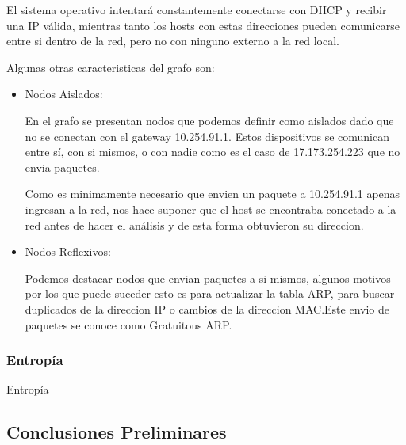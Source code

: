 	\par El sistema operativo intentará constantemente conectarse con DHCP y recibir una IP válida, mientras tanto los hosts con estas direcciones pueden comunicarse entre si dentro de la red, pero no con ninguno externo a la red local.

	\par Algunas otras caracteristicas del grafo son:

\begin{itemize}

\item Nodos Aislados:

	\par En el grafo se presentan nodos que podemos definir como aislados dado que no se conectan con el gateway 10.254.91.1.
Estos dispositivos se comunican entre sí, con si mismos, o con nadie como es el caso de 17.173.254.223 que no envia paquetes.

	\par  Como es minimamente necesario que envien un paquete a 10.254.91.1 apenas ingresan a la red, nos hace suponer que el host se encontraba conectado a la red antes de hacer el análisis y de esta forma obtuvieron su direccion.  


\item Nodos Reflexivos:

	\par Podemos destacar nodos que envian paquetes a si mismos, algunos motivos por los que puede suceder esto es para actualizar la tabla ARP, para buscar duplicados de la direccion IP o cambios de la direccion MAC.Este envio de paquetes se conoce como Gratuitous ARP.

\end{itemize}



	\subsubsection{Entrop\'ia}
		\par Entrop\'ia

\subsection{Conclusiones Preliminares}
